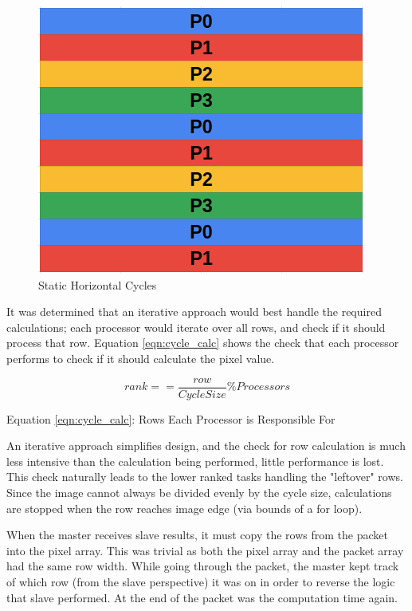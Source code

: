 \documentclass[11pt]{article}
\begin{document}
		\begin{figure}[H]
			\centering
			\includegraphics[width=0.7\linewidth]{Pictures/Cycles}
			\caption{Static Horizontal Cycles}
			\label{fig:cycles}
		\end{figure}
	
		It was determined that an iterative approach would best handle the required calculations; each processor would iterate over all rows, and check if it should process that row. Equation \ref{eqn:cycle_calc} shows the check that each processor performs to check if it should calculate the pixel value.
	
		\begin{equation}\label{eqn:cycle_calc}
		rank == \frac{row}{CycleSize} \% Processors
		\end{equation}
		\begin{center}
			Equation \ref{eqn:cycle_calc}: Rows Each Processor is Responsible For
		\end{center}
	
		An iterative approach simplifies design, and the check for row calculation is much less intensive than the calculation being performed, little performance is lost. This check naturally leads to the lower ranked tasks handling the "leftover" rows. Since the image cannot always be divided evenly by the cycle size, calculations are stopped when the row reaches image edge (via bounds of a for loop).
		
		When the master receives slave results, it must copy the rows from the packet into the pixel array. This was trivial as both the pixel array and the packet array had the same row width. While going through the packet, the master kept track of which row (from the slave perspective) it was on in order to reverse the logic that slave performed. At the end of the packet was the computation time again.
	
\end{document}
